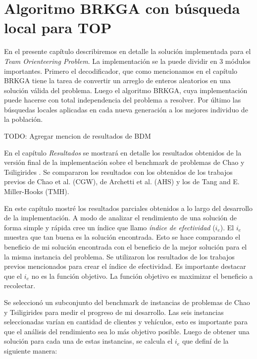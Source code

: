 
\chapter{Algoritmo BRKGA con búsqueda local para TOP}

En el presente capítulo describiremos en detalle la solución implementada para el \textit{Team Orienteering Problem}. La implementación se la puede dividir en 3 módulos importantes. Primero el decodificador, que como mencionamos en el capítulo BRKGA tiene la tarea de convertir un arreglo de enteros aleatorios en una solución válida del problema. Luego el algoritmo BRKGA, cuya implementación puede hacerse con total independencia del problema a resolver. Por último las búsquedas locales aplicadas en cada nueva generación a los mejores individuo de la población. 

\bigskip

TODO: Agregar mencion de resultados de BDM

En el capítulo \textit{Resultados} se mostrará en detalle los resultados obtenidos de la versión final de la implementación sobre el benchmark de problemas de Chao y Tsiligirides \cite{IntancesChaoTsiligirides}. Se compararon los resultados con los obtenidos de los trabajos previos de Chao et al. \cite{ChaoGoldenWasil} (CGW), de Archetti et al. \cite{ArchettiHertzSperanza} (AHS) y los de Tang and E. Miller-Hooks \cite{TangMillerHooks} (TMH).

\bigskip

En este capítulo mostré los resultados parciales obtenidos a lo largo del desarrollo de la implementación. A modo de analizar el rendimiento de una solución de forma simple y rápida cree un índice que llamo \textit{índice de efectividad} ($i_e$). El $i_e$ muestra que tan buena es la solución encontrada. Esto se hace comparando el beneficio de mi solución encontrada con el beneficio de la mejor solución para el la misma instancia del problema. Se utilizaron los resultados de los trabajos previos mencionados para crear el índice de efectividad. Es importante destacar que el $i_e$ no es la función objetivo. La función objetivo es maximizar el beneficio a recolectar. 

\bigskip

Se seleccionó un subconjunto del benchmark de instancias de problemas de Chao y Tsiligirides \cite{IntancesChaoTsiligirides} para medir el progreso de mi desarrollo. Las seis instancias seleccionadas varían en cantidad de clientes y vehículos, esto es importante para que el análisis del rendimiento sea lo más objetivo posible. Luego de obtener una solución para cada una de estas instancias, se calcula el $i_e$ que definí de la siguiente manera:

